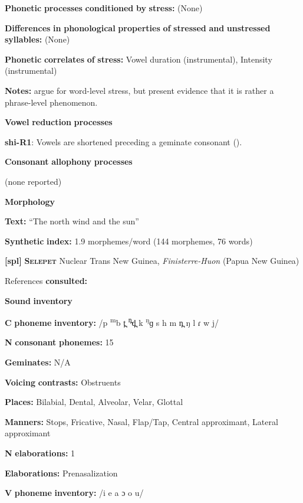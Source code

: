 \begin{styleBody}
\textbf{Phonetic} \textbf{processes} \textbf{conditioned} \textbf{by} \textbf{stress:} (None)

\textbf{Differences} \textbf{in} \textbf{phonological} \textbf{properties} \textbf{of} \textbf{stressed} \textbf{and} \textbf{unstressed} \textbf{syllables:} (None)

\textbf{Phonetic} \textbf{correlates} \textbf{of} \textbf{stress:} Vowel duration (instrumental), Intensity (instrumental)

\textbf{Notes:} \citet{GordonNafi2012} argue for word-level stress, but \citet{RoettgerEtAl2015} present evidence that it is rather a phrase-level phenomenon.

\textbf{Vowel} \textbf{reduction} \textbf{processes}

\textbf{shi-R1}: Vowels are shortened preceding a geminate consonant (\citealt{DellElmedlouai2002}).

\textbf{Consonant} \textbf{allophony} \textbf{processes}

(none reported)

\textbf{Morphology}

\textbf{Text:} “The north wind and the sun” \citep[219]{Ridouane2014}

\textbf{Synthetic} \textbf{index:} 1.9 morphemes/word (144 morphemes, 76 words)

\textbf{[spl]}   \textbf{\textsc{Selepet}}  Nuclear Trans New Guinea, \textit{Finisterre-Huon} (Papua New Guinea)

References \textbf{consulted:} \citet{McElhanon1970}

\textbf{Sound} \textbf{inventory}

\textbf{C} \textbf{phoneme} \textbf{inventory:} /p \textsuperscript{m}b t̪ \textsuperscript{n̪}d̪ k \textsuperscript{ŋ}ɡ s h m n̪ ŋ l ɾ w j/

\textbf{N} \textbf{consonant} \textbf{phonemes:} 15

\textbf{Geminates:} N/A

\textbf{Voicing} \textbf{contrasts:} Obstruents

\textbf{Places:} Bilabial, Dental, Alveolar, Velar, Glottal

\textbf{Manners:} Stops, Fricative, Nasal, Flap/Tap, Central approximant, Lateral approximant

\textbf{N} \textbf{elaborations:} 1

\textbf{Elaborations:} Prenasalization

\textbf{V} \textbf{phoneme} \textbf{inventory:} /i e a ɔ o u/


\end{styleBody}
